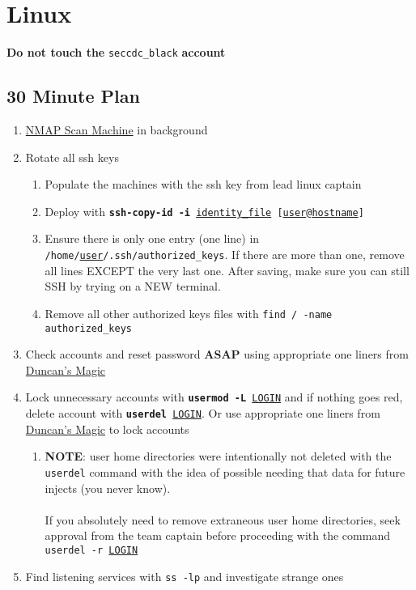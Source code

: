 \documentclass[12pt,letterpaper]{article}
\def\code#1{\textcolor{iris}{\texttt{#1}}}
\def\bf#1{\textbf{#1}}
\def\ul#1{\underline{#1}}
\begin{document}
\pagebreak

\section{Linux}

\bf{Do not touch the} \code{seccdc\_black} \bf{account}

\subsection{30 Minute Plan}

\begin{enumerate}
	\item \hyperref[nmap]{NMAP Scan Machine} in background
	\item Rotate all ssh keys
		\begin{enumerate}
			\item Populate the machines with the ssh key from lead linux captain
			\item Deploy with \code{\bf{ssh-copy-id -i} \ul{identity\_file} [\ul{user}@\ul{hostname}]}
			\item Ensure there is only one entry (one line) in \code{/home/\ul{user}/.ssh/authorized\_keys}. If there are more than one, remove all lines EXCEPT the very last one. After saving, make sure you can still SSH by trying on a NEW terminal.
			\item Remove all other authorized keys files with \code{find / -name authorized\_keys}
		\end{enumerate}
	\item Check accounts and reset password \bf{ASAP} using appropriate one liners from \hyperref[subsec:dmagic]{Duncan's Magic}
	\item Lock unnecessary accounts with \code{\bf{usermod -L} \ul{LOGIN}} and if nothing goes red, delete account with \code{\bf{userdel} \ul{LOGIN}}. Or use appropriate one liners from \hyperref[subsec:dmagic]{Duncan's Magic} to lock accounts
		\begin{enumerate}
			\item \bf{NOTE}: user home directories were intentionally not deleted with the \code{userdel} command with the idea of possible needing that data for future injects (you never know). \\ \\
				If you absolutely need to remove extraneous user home directories, seek approval from the team captain before proceeding with the command \code{userdel -r \ul{LOGIN}}
		\end{enumerate}
	\item Find listening services with \code{ss -lp} and investigate strange ones
\end{enumerate}
\end{document}
